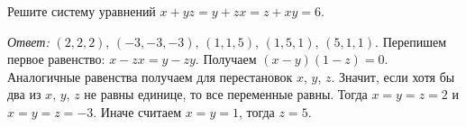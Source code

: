 \problem
Решите систему уравнений $x + y z = y + z x = z + x y = 6$.

\solution
\emph{Ответ:} $(2,2,2)$, $(-3,-3,-3)$, $(1,1,5)$, $(1,5,1)$, $(5,1,1)$.
Перепишем первое равенство: $x - z x = y - z y$.
Получаем $(x - y)(1 - z) = 0$.
Аналогичные равенства получаем для перестановок $x$, $y$, $z$.
Значит, если хотя бы два из $x$, $y$, $z$ не равны единице, то все переменные
равны.
Тогда $x = y = z = 2$ и $x = y = z = -3$.
Иначе считаем $x = y = 1$, тогда $z = 5$.

\endproblem
